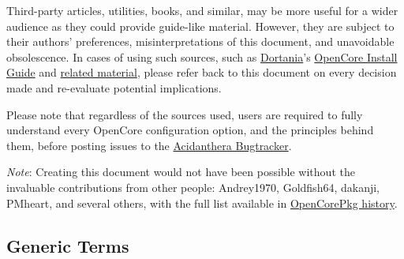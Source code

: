 \documentclass[]{article}
\makeatletter
\renewcommand{\label}[1]{%
\zref@wrapper@immediate{\oldlabel{#1}}}  %
\makeatother
\begin{document}
Third-party articles, utilities, books, and similar, may be more useful for a wider audience as
they could provide guide-like material. However, they are subject to their authors' preferences,
misinterpretations of this document, and unavoidable obsolescence.
In cases of using such sources, such as \href{https://dortania.github.io}{Dortania}'s
\href{https://dortania.github.io/OpenCore-Install-Guide}{OpenCore Install Guide}
and \href{https://dortania.github.io/getting-started}{related material},
please refer back to this document on every decision made and re-evaluate potential implications.

Please note that regardless of the sources used, users are required to fully understand every
OpenCore configuration option, and the principles behind them, before posting issues to the
\href{https://github.com/acidanthera/bugtracker}{Acidanthera Bugtracker}.

\emph{Note}: Creating this document would not have been possible without the invaluable
contributions from other people: Andrey1970, Goldfish64, dakanji, PMheart, and several others,
with the full list available in
\href{https://github.com/acidanthera/OpenCorePkg/commits/master/Docs}{OpenCorePkg history}.

\subsection{Generic Terms}\label{generic-terms}
\end{document}
